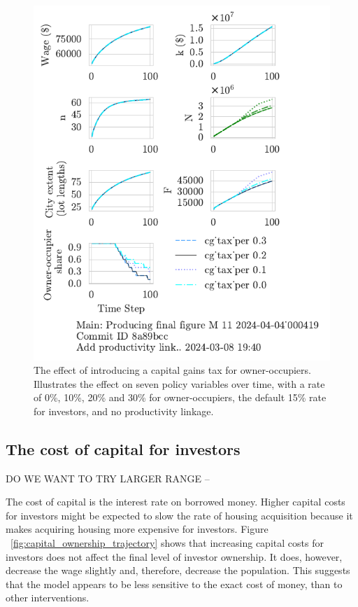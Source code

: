 \begin{figure}[h!t]
\centering
\includegraphics[scale=1.0, trim={0 1.4cm 0 0},clip]{fig/cg_tax_per-000419.pdf}
\caption[The effect of introducing a capital gains tax for owner-occupiers]{The effect of introducing a capital gains tax for owner-occupiers. Illustrates the effect on seven policy variables over time, with a rate of 0\%, 10\%, 20\% and 30\% for owner-occupiers, the default 15\% rate for investors, and no productivity linkage.}
\label{fig:CGpers_ownership_trajectory}
\end{figure}


\newpage

\subsection{The cost of capital for investors}

{\color{red} DO WE WANT TO TRY LARGER RANGE -- }

The cost of capital is the interest rate on borrowed money. Higher capital costs for investors might be expected to slow the rate of housing acquisition because it makes acquiring housing more expensive for investors. Figure ~\ref{fig:capital_ownership_trajectory} shows that increasing capital costs for investors does not affect the final level of investor ownership.  It does, however, decrease the wage slightly and, therefore, decrease the population. This suggests that the model appears to be less sensitive to the exact cost of money, than to other interventions. %

